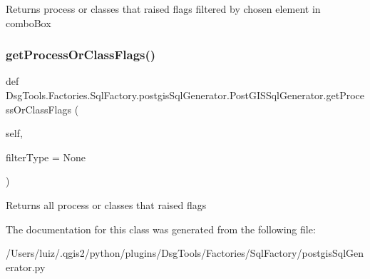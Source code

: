 \begin{DoxyVerb}Returns process or classes that raised flags filtered by
chosen element in comboBox
\end{DoxyVerb}
 \mbox{\label{class_dsg_tools_1_1_factories_1_1_sql_factory_1_1postgis_sql_generator_1_1_post_g_i_s_sql_generator_a09f19fc77a6cc3d0b8b6e1d51f50a961}} 
\subsubsection{\texorpdfstring{get\+Process\+Or\+Class\+Flags()}{getProcessOrClassFlags()}}
{\footnotesize\ttfamily def Dsg\+Tools.\+Factories.\+Sql\+Factory.\+postgis\+Sql\+Generator.\+Post\+G\+I\+S\+Sql\+Generator.\+get\+Process\+Or\+Class\+Flags (\begin{DoxyParamCaption}\item[{}]{self,  }\item[{}]{filter\+Type = {\ttfamily None} }\end{DoxyParamCaption})}

\begin{DoxyVerb}Returns all process or classes that raised flags
\end{DoxyVerb}
 

The documentation for this class was generated from the following file\+:\begin{DoxyCompactItemize}
\item 
/\+Users/luiz/.\+qgis2/python/plugins/\+Dsg\+Tools/\+Factories/\+Sql\+Factory/postgis\+Sql\+Generator.\+py\end{DoxyCompactItemize}
